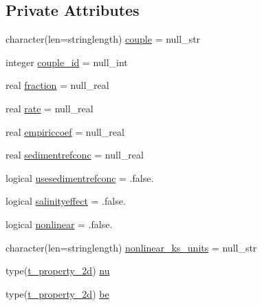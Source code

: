 \subsection*{Private Attributes}
\begin{DoxyCompactItemize}
\item 
character(len=stringlength) \mbox{\hyperlink{structmodulerunoffproperties_1_1t__partition_aa551201116095f2e649b79204abbf7c6}{couple}} = null\+\_\+str
\item 
integer \mbox{\hyperlink{structmodulerunoffproperties_1_1t__partition_a449f938be2f0cff1656cff460a2d2d15}{couple\+\_\+id}} = null\+\_\+int
\item 
real \mbox{\hyperlink{structmodulerunoffproperties_1_1t__partition_aacec9c3ab8a59d3057db85f2b36efc39}{fraction}} = null\+\_\+real
\item 
real \mbox{\hyperlink{structmodulerunoffproperties_1_1t__partition_ad8c9cbdb4ecc699d36b2a1ab03819684}{rate}} = null\+\_\+real
\item 
real \mbox{\hyperlink{structmodulerunoffproperties_1_1t__partition_aa7afa0365fab517b33144d0bf990fb54}{empiriccoef}} = null\+\_\+real
\item 
real \mbox{\hyperlink{structmodulerunoffproperties_1_1t__partition_abdf4287cb12eb29259af6de48ad0b4dc}{sedimentrefconc}} = null\+\_\+real
\item 
logical \mbox{\hyperlink{structmodulerunoffproperties_1_1t__partition_a52eeb9b5a39d3ed57cfb9bab90ee67a0}{usesedimentrefconc}} = .false.
\item 
logical \mbox{\hyperlink{structmodulerunoffproperties_1_1t__partition_a8c2ae6f0ff1ee024eebf6338a7b2d048}{salinityeffect}} = .false.
\item 
logical \mbox{\hyperlink{structmodulerunoffproperties_1_1t__partition_ae92fc7f611884c119f01ae7414945329}{nonlinear}} = .false.
\item 
character(len=stringlength) \mbox{\hyperlink{structmodulerunoffproperties_1_1t__partition_af4cbce5064fe356ac9f51b54e7e9a8da}{nonlinear\+\_\+ks\+\_\+units}} = null\+\_\+str
\item 
type(\mbox{\hyperlink{structmodulerunoffproperties_1_1t__property__2d}{t\+\_\+property\+\_\+2d}}) \mbox{\hyperlink{structmodulerunoffproperties_1_1t__partition_a5e43df9f2190da7c6f62a2f77db32a3a}{nu}}
\item 
type(\mbox{\hyperlink{structmodulerunoffproperties_1_1t__property__2d}{t\+\_\+property\+\_\+2d}}) \mbox{\hyperlink{structmodulerunoffproperties_1_1t__partition_ae2cb970f17a92e72d257c459cc2e2649}{be}}

\end{DoxyCompactItemize}

